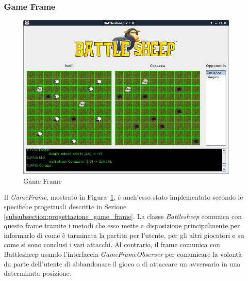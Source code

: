 \subsubsection{Game Frame}
\begin{figure}[!h]
	\centering
	\includegraphics[scale=0.4]{core/imgs/gui/game_frame}
	\caption{Game Frame}
	\label{figure:game_frame}
\end{figure}
Il \textit{GameFrame}, mostrato in Figura~\ref{figure:game_frame}, è anch'esso
stato implementato secondo le specifiche progettuali descritte in Sezione
\ref{subsubsection:progettazione_game_frame}.\newline
La classe \textit{Battlesheep} comunica con questo frame tramite i metodi che
esso mette a disposizione principalmente per informarlo di come è tarminata la
partita per l'utente, per gli altri giocatori e su come si sono conclusi i vari
attacchi. Al contrario, il frame comunica con Battlesheep usando l'interfaccia
\textit{GameFrameObserver} per comunicare la volontà da parte dell'utente di
abbandonare il gioco o di attaccare un avversario in una daterminata posizione.
